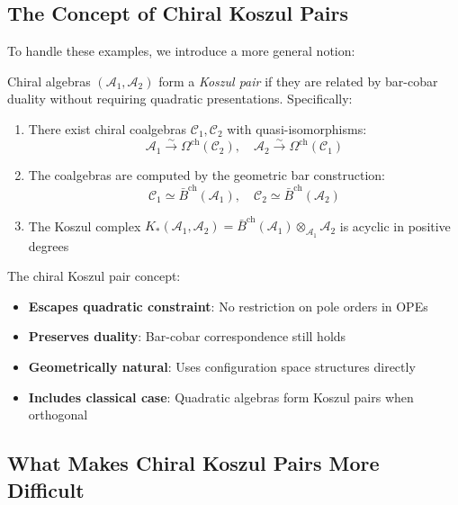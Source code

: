 \subsection{The Concept of Chiral Koszul Pairs}

To handle these examples, we introduce a more general notion:

\begin{definition}
Chiral algebras $(\mathcal{A}_1, \mathcal{A}_2)$ form a \emph{Koszul pair} if they are related by bar-cobar duality without requiring quadratic presentations. Specifically:
\begin{enumerate}
\item There exist chiral coalgebras $\mathcal{C}_1, \mathcal{C}_2$ with quasi-isomorphisms:
$$\mathcal{A}_1 \xrightarrow{\sim} \Omega^{\text{ch}}(\mathcal{C}_2), \quad \mathcal{A}_2 \xrightarrow{\sim} \Omega^{\text{ch}}(\mathcal{C}_1)$$

\item The coalgebras are computed by the geometric bar construction:
$$\mathcal{C}_1 \simeq \bar{B}^{\text{ch}}(\mathcal{A}_1), \quad \mathcal{C}_2 \simeq \bar{B}^{\text{ch}}(\mathcal{A}_2)$$

\item The Koszul complex $K_*(\mathcal{A}_1, \mathcal{A}_2) = \bar{B}^{\text{ch}}(\mathcal{A}_1) \otimes_{\mathcal{A}_1} \mathcal{A}_2$ is acyclic in positive degrees
\end{enumerate}
\end{definition}

\begin{remark}
The chiral Koszul pair concept:
\begin{itemize}
\item \textbf{Escapes quadratic constraint}: No restriction on pole orders in OPEs
\item \textbf{Preserves duality}: Bar-cobar correspondence still holds
\item \textbf{Geometrically natural}: Uses configuration space structures directly
\item \textbf{Includes classical case}: Quadratic algebras form Koszul pairs when orthogonal
\end{itemize}
\end{remark}

\subsection{What Makes Chiral Koszul Pairs More Difficult}

